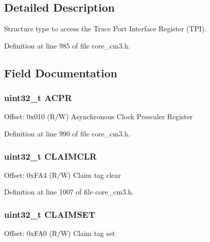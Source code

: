 \subsection{Detailed Description}
Structure type to access the Trace Port Interface Register (T\+PI). 

Definition at line 985 of file core\+\_\+cm3.\+h.



\subsection{Field Documentation}
\subsubsection[{\texorpdfstring{A\+C\+PR}{ACPR}}]{ uint32\+\_\+t A\+C\+PR}\hypertarget{struct_t_p_i___type_a49a770cf0b7ec970f919f8ac22634fff}{}\label{struct_t_p_i___type_a49a770cf0b7ec970f919f8ac22634fff}
Offset\+: 0x010 (R/W) Asynchronous Clock Prescaler Register 

Definition at line 990 of file core\+\_\+cm3.\+h.

\subsubsection[{\texorpdfstring{C\+L\+A\+I\+M\+C\+LR}{CLAIMCLR}}]{ uint32\+\_\+t C\+L\+A\+I\+M\+C\+LR}\hypertarget{struct_t_p_i___type_a1f74caab7b0a7afa848c63ce8ebc6a6f}{}\label{struct_t_p_i___type_a1f74caab7b0a7afa848c63ce8ebc6a6f}
Offset\+: 0x\+F\+A4 (R/W) Claim tag clear 

Definition at line 1007 of file core\+\_\+cm3.\+h.

\subsubsection[{\texorpdfstring{C\+L\+A\+I\+M\+S\+ET}{CLAIMSET}}]{ uint32\+\_\+t C\+L\+A\+I\+M\+S\+ET}\hypertarget{struct_t_p_i___type_a974d17c9a0b0b1b894e9707d158b0fbe}{}\label{struct_t_p_i___type_a974d17c9a0b0b1b894e9707d158b0fbe}
Offset\+: 0x\+F\+A0 (R/W) Claim tag set 

